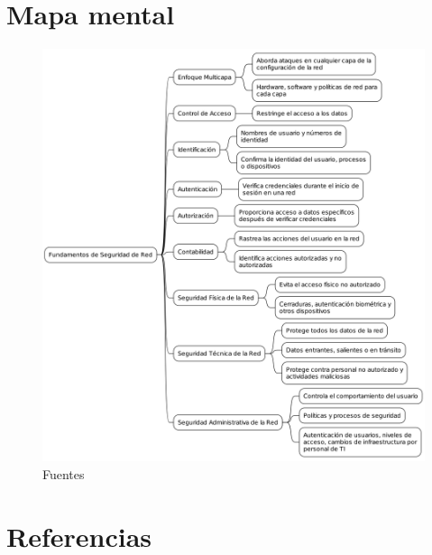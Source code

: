 \documentclass[11pt]{article}
\begin{document}
\section{Mapa mental}
\label{sec:org1113ec5}
\begin{figure}[htbp]
\centering
\includegraphics[width=.9\linewidth]{./images/diagram.png}
\caption{Fuentes \cite{Naz_2023}}
\end{figure}


\section{Referencias}
\label{sec:org42a7736}
\printbibliography[heading=none]
\end{document}
